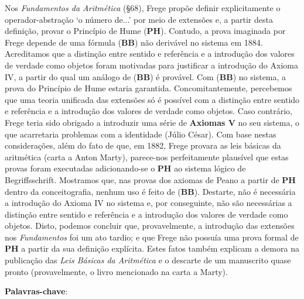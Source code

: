
\begin{resumo}  
    Nos \textit{Fundamentos da Aritmética} (§68), Frege propõe definir explicitamente o operador-abstração `o número de...' por meio de extensões e, a partir desta definição, provar o Princípio de Hume (\textbf{PH}). Contudo, a prova imaginada por Frege depende de uma fórmula (\textbf{BB}) não derivável no sistema em 1884. Acreditamos que a distinção entre sentido e referência e a introdução dos valores de verdade como objetos foram motivadas para justificar a introdução do Axioma IV, a partir do qual um análogo de (\textbf{BB}) é provável. Com (\textbf{BB}) no sistema, a prova do Princípio de Hume estaria garantida. Concomitantemente, percebemos que uma teoria unificada das extensões só é possível com a distinção entre sentido e referência e a introdução dos valores de verdade como objetos. Caso contrário, Frege teria sido obrigado a introduzir uma série de \textbf{Axiomas V} no seu sistema, o que acarretaria problemas com a identidade (Júlio César). Com base nestas considerações, além do fato de que, em 1882, Frege provara as leis básicas da aritmética (carta a Anton Marty), parece-nos perfeitamente plausível que estas provas foram executadas adicionando-se o \textbf{PH} ao sistema lógico de Begriffsschrift. Mostramos que, nas provas dos axiomas de Peano a partir de \textbf{PH} dentro da conceitografia, nenhum uso é feito de (\textbf{BB}). Destarte, não é necessária a introdução do Axioma IV no sistema e, por conseguinte, não são necessárias a distinção entre sentido e referência e a introdução dos valores de verdade como objetos. Disto, podemos concluir que, provavelmente, a introdução das extensões nos \textit{Fundamentos} foi um ato tardio; e que Frege não possuía uma prova formal de \textbf{PH} a partir da sua definição explícita. Estes fatos também explicam a demora na publicação das \textit{Leis Básicas da Aritmética} e o descarte de um manuscrito quase pronto (provavelmente, o livro mencionado na carta a Marty). 
\vspace{\onelineskip} 

\noindent \textbf{Palavras-chave}: \palavraschaves
\end{resumo}